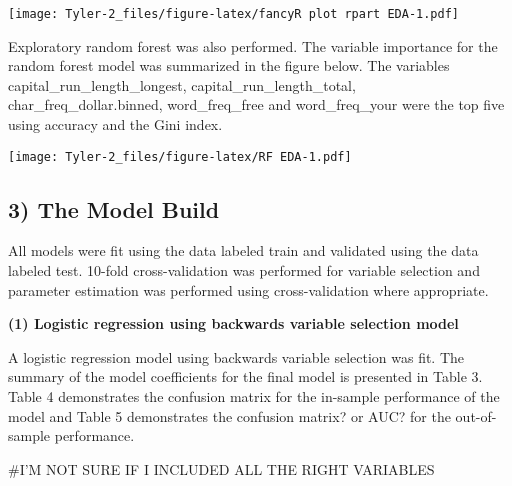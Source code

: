 \documentclass[12pt,]{article}
\begin{document}
\texttt{[image: Tyler-2\_files/figure-latex/fancyR plot rpart EDA-1.pdf]}

Exploratory random forest was also performed. The variable importance
for the random forest model was summarized in the figure below. The
variables capital\_run\_length\_longest, capital\_run\_length\_total,
char\_freq\_dollar.binned, word\_freq\_free and word\_freq\_your were
the top five using accuracy and the Gini index.

\texttt{[image: Tyler-2\_files/figure-latex/RF EDA-1.pdf]}

\hypertarget{the-model-build}{%
\subsection{3) The Model Build}\label{the-model-build}}

All models were fit using the data labeled train and validated using the
data labeled test. 10-fold cross-validation was performed for variable
selection and parameter estimation was performed using cross-validation
where appropriate.

\textbf{(1) Logistic regression using backwards variable selection
model}

A logistic regression model using backwards variable selection was fit.
The summary of the model coefficients for the final model is presented
in Table 3. Table 4 demonstrates the confusion matrix for the in-sample
performance of the model and Table 5 demonstrates the confusion matrix?
or AUC? for the out-of-sample performance.

\#I'M NOT SURE IF I INCLUDED ALL THE RIGHT VARIABLES
\end{document}
